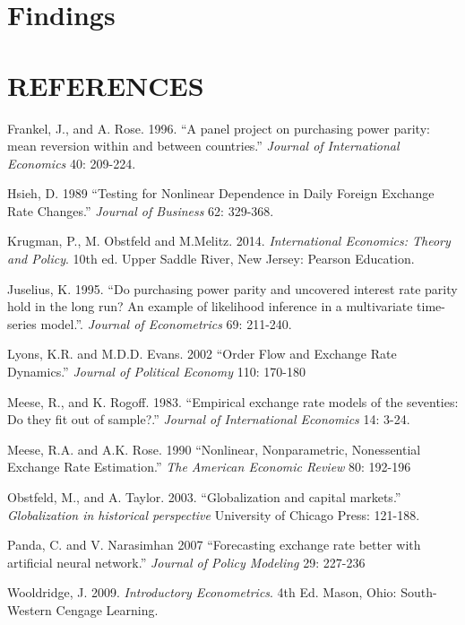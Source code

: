 \documentclass{sig-alternate-05-2015}
\begin{document}
\section{Findings}


     
\newenvironment{hangref}{\begin{list}{}{\setlength{\itemsep}{0pt}
\setlength{\parsep}{0pt}\setlength{\rightmargin}{0pt}
\setlength{\leftmargin}{+\parindent}
\setlength{\itemindent}{-\parindent}}}{\end{list}}
\section*{REFERENCES}
\begin{hangref}

\item Frankel, J., and A. Rose. 1996.
``A panel project on purchasing power parity: mean reversion within and between countries.''
{\it Journal of International Economics} 40: 209-224.

\item Hsieh, D. 1989
``Testing for Nonlinear Dependence in Daily Foreign Exchange Rate Changes.''
{\it Journal of Business} 62: 329-368.

\item Krugman, P., M. Obstfeld and M.Melitz.  2014.
{\it International Economics: Theory and Policy}. 10th ed.
Upper Saddle River, New Jersey: Pearson Education.

\item Juselius, K. 1995.
``Do purchasing power parity and uncovered interest rate parity hold in the long run? An example of likelihood inference in a multivariate time-series model.''.
{\it Journal of Econometrics} 69: 211-240.

\item Lyons, K.R. and M.D.D. Evans. 2002
``Order Flow and Exchange Rate Dynamics.''
{\it Journal of Political Economy} 110: 170-180

\item Meese, R., and K. Rogoff. 1983.
``Empirical exchange rate models of the seventies: Do they fit out of sample?.'' 
{\it Journal of International Economics} 14: 3-24.

\item Meese, R.A. and A.K. Rose. 1990
``Nonlinear, Nonparametric, Nonessential Exchange Rate Estimation.''
{\it The American Economic Review} 80: 192-196 

\item Obstfeld, M., and A. Taylor. 2003.
``Globalization and capital markets.'' 
{\it Globalization in historical perspective}
University of Chicago Press: 121-188.

\item Panda, C. and V. Narasimhan 2007
``Forecasting exchange rate better with artificial neural network.''
{\it Journal of Policy Modeling} 29: 227-236

\item Wooldridge, J. 2009.
{\it Introductory Econometrics}. 4th Ed.
Mason, Ohio: South-Western Cengage Learning.

\end{hangref}
\end{document}
